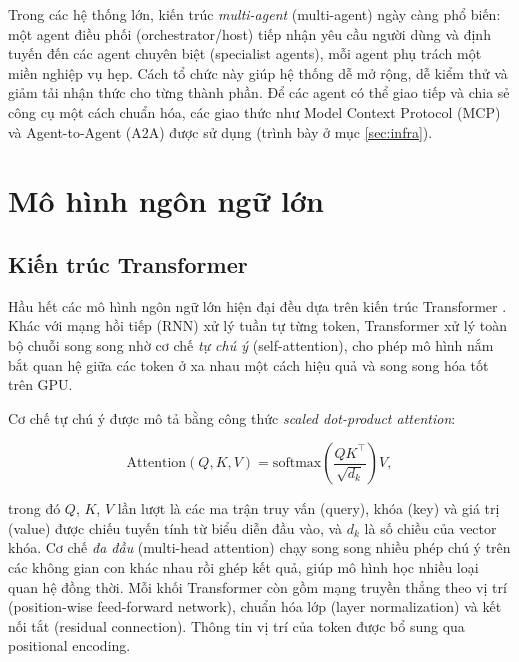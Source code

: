 Trong các hệ thống lớn, kiến trúc \emph{multi-agent} (multi-agent) ngày càng phổ biến: một
agent điều phối (orchestrator/host) tiếp nhận yêu cầu người dùng và định tuyến đến các
agent chuyên biệt (specialist agents), mỗi agent phụ trách một miền nghiệp vụ hẹp. Cách
tổ chức này giúp hệ thống dễ mở rộng, dễ kiểm thử và giảm tải nhận thức cho từng thành
phần. Để các agent có thể giao tiếp và chia sẻ công cụ một cách chuẩn hóa, các giao thức
như Model Context Protocol (MCP) và Agent-to-Agent (A2A) được sử dụng (trình bày ở mục
\ref{sec:infra}).

\section{Mô hình ngôn ngữ lớn}
\label{sec:llm}

\subsection{Kiến trúc Transformer}

Hầu hết các mô hình ngôn ngữ lớn hiện đại đều dựa trên kiến trúc Transformer
\cite{vaswani2017attention}. Khác với mạng hồi tiếp (RNN) xử lý tuần tự từng token,
Transformer xử lý toàn bộ chuỗi song song nhờ cơ chế \emph{tự chú ý} (self-attention),
cho phép mô hình nắm bắt quan hệ giữa các token ở xa nhau một cách hiệu quả và song song
hóa tốt trên GPU.

Cơ chế tự chú ý được mô tả bằng công thức \emph{scaled dot-product attention}:

\begin{equation}
\mathrm{Attention}(Q, K, V) = \mathrm{softmax}\!\left(\frac{QK^{\top}}{\sqrt{d_k}}\right) V,
\end{equation}

trong đó $Q$, $K$, $V$ lần lượt là các ma trận truy vấn (query), khóa (key) và giá trị
(value) được chiếu tuyến tính từ biểu diễn đầu vào, và $d_k$ là số chiều của vector khóa.
Cơ chế \emph{đa đầu} (multi-head attention) chạy song song nhiều phép chú ý trên các không
gian con khác nhau rồi ghép kết quả, giúp mô hình học nhiều loại quan hệ đồng thời. Mỗi
khối Transformer còn gồm mạng truyền thẳng theo vị trí (position-wise feed-forward
network), chuẩn hóa lớp (layer normalization) và kết nối tắt (residual connection).
Thông tin vị trí của token được bổ sung qua positional encoding.

